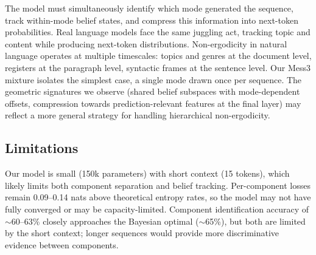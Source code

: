 \documentclass{article}
\begin{document}
The model must simultaneously identify which mode generated the sequence, track within-mode belief states, and compress this information into next-token probabilities. Real language models face the same juggling act, tracking topic and content while producing next-token distributions. Non-ergodicity in natural language operates at multiple timescales: topics and genres at the document level, registers at the paragraph level, syntactic frames at the sentence level. Our Mess3 mixture isolates the simplest case, a single mode drawn once per sequence. The geometric signatures we observe (shared belief subspaces with mode-dependent offsets, compression towards prediction-relevant features at the final layer) may reflect a more general strategy for handling hierarchical non-ergodicity.

\subsection{Limitations}

Our model is small (150k parameters) with short context (15 tokens), which likely limits both component separation and belief tracking. Per-component losses remain 0.09--0.14 nats above theoretical entropy rates, so the model may not have fully converged or may be capacity-limited. Component identification accuracy of $\sim$60--63\% closely approaches the Bayesian optimal ($\sim$65\%), but both are limited by the short context; longer sequences would provide more discriminative evidence between components.




\end{document}
